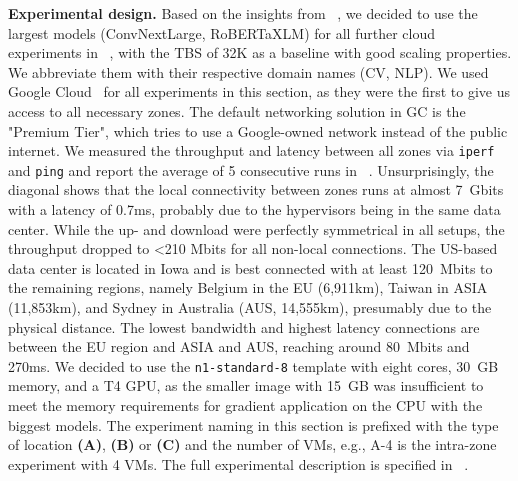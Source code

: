 \textbf{Experimental design.} 
Based on the insights from ~, we decided to use the largest models (ConvNextLarge, RoBERTaXLM) for all further cloud experiments in ~, with the TBS of 32K as a baseline with good scaling properties.
We abbreviate them with their respective domain names (CV, NLP).
We used Google Cloud~\cite{gcweb} for all experiments in this section, as they were the first to give us access to all necessary zones.
The default networking solution in GC is the "Premium Tier", which tries to use a Google-owned network instead of the public internet.
We measured the throughput and latency between all zones via \texttt{iperf} and \texttt{ping} and report the average of 5 consecutive runs in ~.
Unsurprisingly, the diagonal shows that the local connectivity between zones runs at almost 7~Gbits with a latency of 0.7ms, probably due to the hypervisors being in the same data center.
While the up- and download were perfectly symmetrical in all setups, the throughput dropped to <210 Mbits for all non-local connections.
The US-based data center is located in Iowa and is best connected with at least 120~Mbits to the remaining regions, namely Belgium in the EU (6,911km), Taiwan in ASIA (11,853km), and Sydney in Australia (AUS, 14,555km), presumably due to the physical distance. 
The lowest bandwidth and highest latency connections are between the EU region and ASIA and AUS, reaching around 80~Mbits and 270ms.
We decided to use the \texttt{n1-standard-8} template with eight cores, 30~GB memory, and a T4 GPU, as the smaller image with 15~GB was insufficient to meet the memory requirements for gradient application on the CPU with the biggest models.
The experiment naming in this section is prefixed with the type of location \textbf{(A)}, \textbf{(B)} or \textbf{(C)} and the number of VMs, e.g., A-4 is the intra-zone experiment with 4 VMs.
The full experimental description is specified in ~.
\vspace*{-2mm}
